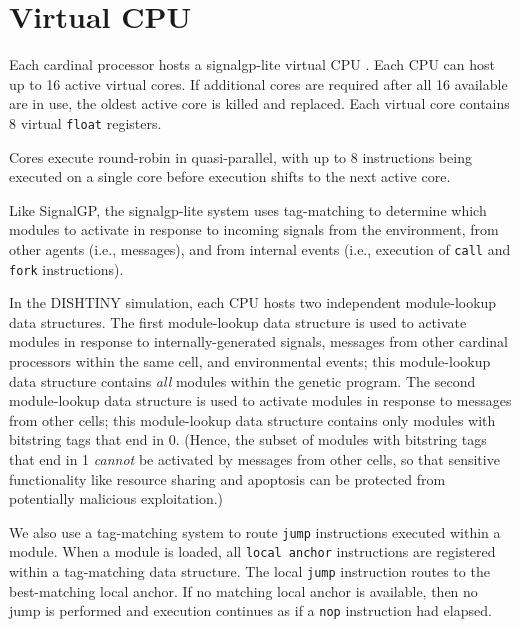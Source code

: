 \section{Virtual CPU} \label{sec:virtual_cpu}

Each cardinal processor hosts a signalgp-lite virtual CPU \citep{lalejini2018evolving,moreno2021signalgp}.
Each CPU can host up to 16 active virtual cores.
If additional cores are required after all 16 available are in use, the oldest active core is killed and replaced.
Each virtual core contains 8 virtual \texttt{float} registers.

Cores execute round-robin in quasi-parallel, with up to 8 instructions being executed on a single core before execution shifts to the next active core.

Like SignalGP, the signalgp-lite system uses tag-matching to determine which modules to activate in response to incoming signals from the environment, from other agents (i.e., messages), and from internal events (i.e., execution of \texttt{call} and \texttt{fork} instructions).

In the DISHTINY simulation, each CPU hosts two independent module-lookup data structures.
The first module-lookup data structure is used to activate modules in response to internally-generated signals, messages from other cardinal processors within the same cell, and environmental events;
this module-lookup data structure contains \textit{all} modules within the genetic program.
The second module-lookup data structure is used to activate modules in response to messages from other cells;
this module-lookup data structure contains only modules with bitstring tags that end in 0.
(Hence, the subset of modules with bitstring tags that end in 1 \textit{cannot} be activated by messages from other cells, so that sensitive functionality like resource sharing and apoptosis can be protected from potentially malicious exploitation.)

We also use a tag-matching system to route \texttt{jump} instructions executed within a module.
When a module is loaded, all \texttt{local anchor} instructions are registered within a tag-matching data structure.
The local \texttt{jump} instruction routes to the best-matching local anchor.
If no matching local anchor is available, then no jump is performed and execution continues as if a \texttt{nop} instruction had elapsed.
